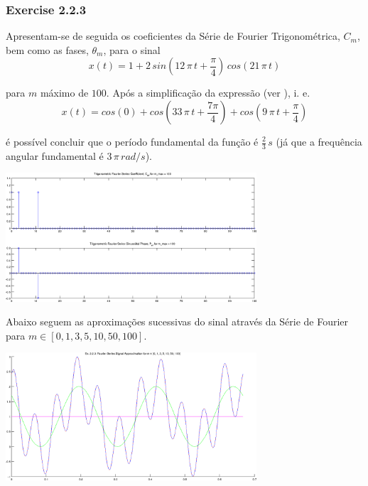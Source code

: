 \documentclass[a4paper]{article}
\begin{document}
\subsubsection{Exercise 2.2.3}
\label{subsubsec:ex_2_2_3}
\noindent Apresentam-se de seguida os coeficientes da Série de Fourier Trigonométrica, $C_m$, bem como as fases, $\theta_m$, para o sinal
\begin{equation}
	x(t) = 1 + 2 \, sin\left(12 \, \pi \, t + \frac{\pi}{4}\right) \, cos(21 \, \pi \, t)
\end{equation}

\noindent para $m$ máximo de $100$. Após a simplificação da expressão (ver \emph{}), i. e.
\begin{equation}
	x(t) = cos(0) + cos\left(33 \, \pi \, t + \frac{7 \pi}{4}\right) + cos\left(9 \, \pi \, t + \frac{\pi}{4}\right)
	\label{eq:ex_2_2_3}
\end{equation}

\noindent é possível concluir que o período fundamental da função é $\frac{2}{3} \, s$ (já que a frequência angular fundamental é $3 \, \pi \, rad/s$).

\clearpage
\begin{center}
	\includegraphics[width=0.70\textwidth]{images/ex2_2_3_cm_tm.png}
	\label{fig:ex2_2_3_cm_tm}
\end{center}

\noindent Abaixo seguem as aproximações sucessivas do sinal através da Série de Fourier para $m \in [0, 1, 3, 5, 10, 50, 100]$.
\begin{center}
	\includegraphics[width=0.70\textwidth]{images/ex2_2_3_approx.png}
	\label{fig:ex2_2_3_approx}
\end{center}
\end{document}
